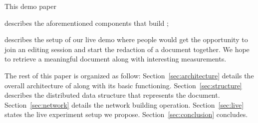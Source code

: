 This demo paper
\begin{inparaenum}[(i)]
\item describes the aforementioned components that build \CRATE;
\item describes the setup of our live demo where people would get the
  opportunity to join an editing session and start the redaction of a document
  together. We hope to retrieve a meaningful document along with interesting
  measurements.
\end{inparaenum}

The rest of this paper is organized as follow: Section~\ref{sec:architecture}
details the overall architecture of \CRATE along with its basic
functioning. Section~\ref{sec:structure} describes the distributed data
structure that represents the document. Section~\ref{sec:network} details the
network building operation. Section~\ref{sec:live} states the live experiment
setup we propose. Section~\ref{sec:conclusion} concludes.



